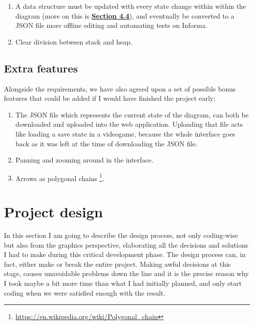 \documentclass[]{usiinfbachelorproject}
\begin{document}
\begin{enumerate}
	\item A data structure must be updated with every state change within within the diagram (more on this is \hyperref[storing states]{\textbf{Section 4.4}}), and eventually be converted to a JSON file more offline editing and automating tests on Informa.
	\item Clear division between stack and heap.
\end{enumerate}

\subsection{Extra features}

Alongside the requirements, we have also agreed upon a set of possible bonus features that could be added if I would have finished the project early:

\begin{enumerate}
	\item The JSON file which represents the current state of the diagram, can both be downloaded and uploaded into the web application. Uploading that file acts like loading a save state in a videogame, because the whole interface goes back as it was left at the time of downloading the JSON file.
	\item Panning and zooming around in the interface.
	\item Arrows as polygonal chains \footnote{\url{https://en.wikipedia.org/wiki/Polygonal_chain}}.
\end{enumerate}

\vspace{\fill}
\pagebreak

\section{Project design} \label{design}

In this section I am going to describe the design process, not only coding-wise but also from the graphics perspective, elaborating all the decisions and solutions I had to make during this critical development phase. The design process can, in fact, either make or break the entire project. Making awful decisions at this stage, causes unavoidable problems down the line and it is the precise reason why I took maybe a bit more time than what I had initially planned, and only start coding when we were satisfied enough with the result.
\end{document}
